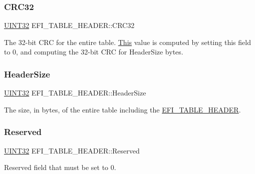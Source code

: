 \subsubsection{\texorpdfstring{C\+R\+C32}{CRC32}}
{\footnotesize\ttfamily \hyperlink{_processor_bind_8h_ae1e6edbbc26d6fbc71a90190d0266018}{U\+I\+N\+T32} E\+F\+I\+\_\+\+T\+A\+B\+L\+E\+\_\+\+H\+E\+A\+D\+E\+R\+::\+C\+R\+C32}

The 32-\/bit C\+RC for the entire table. \hyperlink{namespace_this}{This} value is computed by setting this field to 0, and computing the 32-\/bit C\+RC for Header\+Size bytes. \mbox{\label{struct_e_f_i___t_a_b_l_e___h_e_a_d_e_r_ab16fde8c7521836c272dc21fdc83d63f}} 
\subsubsection{\texorpdfstring{Header\+Size}{HeaderSize}}
{\footnotesize\ttfamily \hyperlink{_processor_bind_8h_ae1e6edbbc26d6fbc71a90190d0266018}{U\+I\+N\+T32} E\+F\+I\+\_\+\+T\+A\+B\+L\+E\+\_\+\+H\+E\+A\+D\+E\+R\+::\+Header\+Size}

The size, in bytes, of the entire table including the \hyperlink{struct_e_f_i___t_a_b_l_e___h_e_a_d_e_r}{E\+F\+I\+\_\+\+T\+A\+B\+L\+E\+\_\+\+H\+E\+A\+D\+ER}. \mbox{\label{struct_e_f_i___t_a_b_l_e___h_e_a_d_e_r_a6d8ed5bbbac04b13751ab12f4e338913}} 
\subsubsection{\texorpdfstring{Reserved}{Reserved}}
{\footnotesize\ttfamily \hyperlink{_processor_bind_8h_ae1e6edbbc26d6fbc71a90190d0266018}{U\+I\+N\+T32} E\+F\+I\+\_\+\+T\+A\+B\+L\+E\+\_\+\+H\+E\+A\+D\+E\+R\+::\+Reserved}

Reserved field that must be set to 0. \mbox{\label{struct_e_f_i___t_a_b_l_e___h_e_a_d_e_r_a81ed6a4813ad43b0e1252011b626829a}} 
